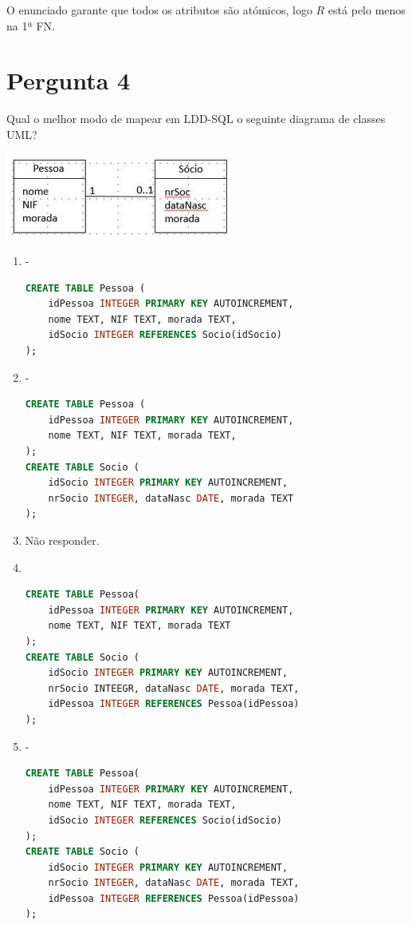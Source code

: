 \documentclass[type=normal, year=2014/15]{bdad_exam}
\begin{document}
{O enunciado garante que todos os atributos são atómicos, logo $R$ está pelo menos na 1ª FN.

\section{Pergunta 4} 
Qual o melhor modo de mapear em LDD-SQL o seguinte diagrama de classes UML?
\begin{center}
    \includegraphics[scale=0.6]{questions/2015N_02.png}
\end{center}
\begin{enumerate}[label=\alph*.]\itemsep0em
    \item - \\
    \begin{lstlisting}[language=SQL]
CREATE TABLE Pessoa (
    idPessoa INTEGER PRIMARY KEY AUTOINCREMENT,
    nome TEXT, NIF TEXT, morada TEXT,
    idSocio INTEGER REFERENCES Socio(idSocio)
);
    \end{lstlisting}
    \item - \\
    \begin{lstlisting}[language=SQL]
CREATE TABLE Pessoa (
    idPessoa INTEGER PRIMARY KEY AUTOINCREMENT,
    nome TEXT, NIF TEXT, morada TEXT,
);
CREATE TABLE Socio (
    idSocio INTEGER PRIMARY KEY AUTOINCREMENT,
    nrSocio INTEGER, dataNasc DATE, morada TEXT
);
    \end{lstlisting}
    \item Não responder.
    \item \textbf{\greencheckmark} \\
    \begin{lstlisting}[language=SQL]
CREATE TABLE Pessoa(
    idPessoa INTEGER PRIMARY KEY AUTOINCREMENT,
    nome TEXT, NIF TEXT, morada TEXT
);
CREATE TABLE Socio (
    idSocio INTEGER PRIMARY KEY AUTOINCREMENT,
    nrSocio INTEEGR, dataNasc DATE, morada TEXT,
    idPessoa INTEGER REFERENCES Pessoa(idPessoa)
);
    \end{lstlisting}
    \item - \\
    \begin{lstlisting}[language=SQL]
CREATE TABLE Pessoa(
    idPessoa INTEGER PRIMARY KEY AUTOINCREMENT,
    nome TEXT, NIF TEXT, morada TEXT,
    idSocio INTEGER REFERENCES Socio(idSocio)
);
CREATE TABLE Socio (
    idSocio INTEGER PRIMARY KEY AUTOINCREMENT,
    nrSocio INTEGER, dataNasc DATE, morada TEXT,
    idPessoa INTEGER REFERENCES Pessoa(idPessoa)
);
    \end{lstlisting}
\end{enumerate}

}
\end{document}

